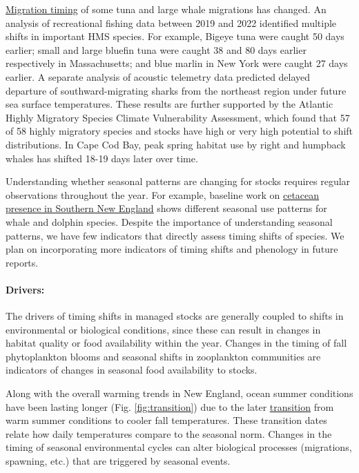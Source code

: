 \documentclass[
  10pt,
]{article}
\begin{document}
\href{https://noaa-edab.github.io/catalog/timing_shifts.html}{Migration timing} of some tuna and large whale migrations has changed. An analysis of recreational fishing data between 2019 and 2022 identified multiple shifts in important HMS species. For example, Bigeye tuna were caught 50 days earlier; small and large bluefin tuna were caught 38 and 80 days earlier respectively in Massachusetts; and blue marlin in New York were caught 27 days earlier. A separate analysis of acoustic telemetry data predicted delayed departure of southward-migrating sharks from the northeast region under future sea surface temperatures. These results are further supported by the Atlantic Highly Migratory Species Climate Vulnerability Assessment, which found that 57 of 58 highly migratory species and stocks have high or very high potential to shift distributions. In Cape Cod Bay, peak spring habitat use by right and humpback whales has shifted 18-19 days later over time.

Understanding whether seasonal patterns are changing for stocks requires regular observations throughout the year. For example, baseline work on \href{https://noaa-edab.github.io/catalog/cetacean_acoustic.html}{cetacean presence in Southern New England} shows different seasonal use patterns for whale and dolphin species. Despite the importance of understanding seasonal patterns, we have few indicators that directly assess timing shifts of species. We plan on incorporating more indicators of timing shifts and phenology in future reports.

\paragraph{Drivers:}\label{drivers-1}

The drivers of timing shifts in managed stocks are generally coupled to shifts in environmental or biological conditions, since these can result in changes in habitat quality or food availability within the year. Changes in the timing of fall phytoplankton blooms and seasonal shifts in zooplankton communities are indicators of changes in seasonal food availability to stocks.

Along with the overall warming trends in New England, ocean summer conditions have been lasting longer (Fig. \ref{fig:transition}) due to the later \href{https://noaa-edab.github.io/catalog/trans_dates.html}{transition} from warm summer conditions to cooler fall temperatures. These transition dates relate how daily temperatures compare to the seasonal norm. Changes in the timing of seasonal environmental cycles can alter biological processes (migrations, spawning, etc.) that are triggered by seasonal events.
\end{document}
